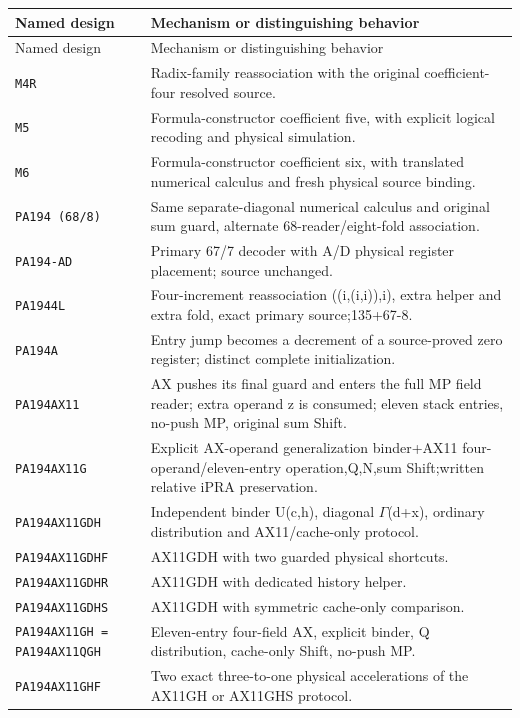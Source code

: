 \begin{longtable}{@{}p{.29\linewidth}p{.65\linewidth}@{}}
\toprule Named design & Mechanism or distinguishing behavior\\
\midrule\endfirsthead
\toprule Named design & Mechanism or distinguishing behavior\\
\midrule\endhead
\bottomrule\endfoot
\texttt{M4R} & Radix-family reassociation with the original coefficient-four resolved source.\\[3pt]
\texttt{M5} & Formula-constructor coefficient five, with explicit logical recoding and physical simulation.\\[3pt]
\texttt{M6} & Formula-constructor coefficient six, with translated numerical calculus and fresh physical source binding.\\[3pt]
\texttt{PA194 (68/8)} & Same separate-diagonal numerical calculus and original sum guard, alternate 68-reader/eight-fold association.\\[3pt]
\texttt{PA194-AD} & Primary 67/7 decoder with A/D physical register placement; source unchanged.\\[3pt]
\texttt{PA1944L} & Four-increment reassociation ((i,(i,i)),i), extra helper and extra fold, exact primary source;135+67-8.\\[3pt]
\texttt{PA194A} & Entry jump becomes a decrement of a source-proved zero register; distinct complete initialization.\\[3pt]
\texttt{PA194AX11} & AX pushes its final guard and enters the full MP field reader; extra operand z is consumed; eleven stack entries, no-push MP, original sum Shift.\\[3pt]
\texttt{PA194AX11G} & Explicit AX-operand generalization binder+AX11 four-operand/eleven-entry operation,Q,N,sum Shift;written relative iPRA preservation.\\[3pt]
\texttt{PA194AX11GDH} & Independent binder U(c,h), diagonal $\Gamma$(d+x), ordinary distribution and AX11/cache-only protocol.\\[3pt]
\texttt{PA194AX11GDHF} & AX11GDH with two guarded physical shortcuts.\\[3pt]
\texttt{PA194AX11GDHR} & AX11GDH with dedicated history helper.\\[3pt]
\texttt{PA194AX11GDHS} & AX11GDH with symmetric cache-only comparison.\\[3pt]
\texttt{PA194AX11GH = PA194AX11QGH} & Eleven-entry four-field AX, explicit binder, Q distribution, cache-only Shift, no-push MP.\\[3pt]
\texttt{PA194AX11GHF} & Two exact three-to-one physical accelerations of the AX11GH or AX11GHS protocol.\\[3pt]

\end{longtable}
